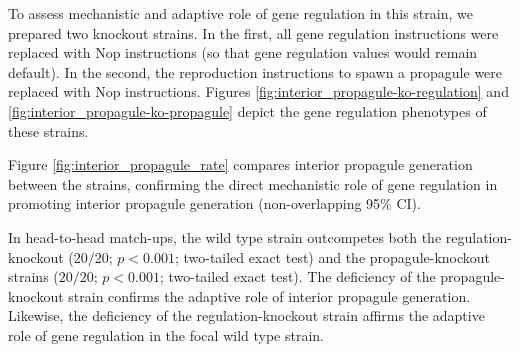To assess mechanistic and adaptive role of gene regulation in this strain, we prepared two knockout strains.
In the first, all gene regulation instructions were replaced with Nop instructions (so that gene regulation values would remain default).
In the second, the reproduction instructions to spawn a propagule were replaced with Nop instructions.
Figures \ref{fig:interior_propagule-ko-regulation} and \ref{fig:interior_propagule-ko-propagule} depict the gene regulation phenotypes of these strains.

Figure \ref{fig:interior_propagule_rate} compares interior propagule generation between the strains, confirming the direct mechanistic role of gene regulation in promoting interior propagule generation (non-overlapping 95\% CI).

In head-to-head match-ups, the wild type strain outcompetes both the regulation-knockout ($20/20$; $p < 0.001$; two-tailed exact test) and the propagule-knockout strains
($20/20$; $p < 0.001$; two-tailed exact test).
The deficiency of the propagule-knockout strain confirms the adaptive role of interior propagule generation.
Likewise, the deficiency of the regulation-knockout strain affirms the adaptive role of gene regulation in the focal wild type strain.
